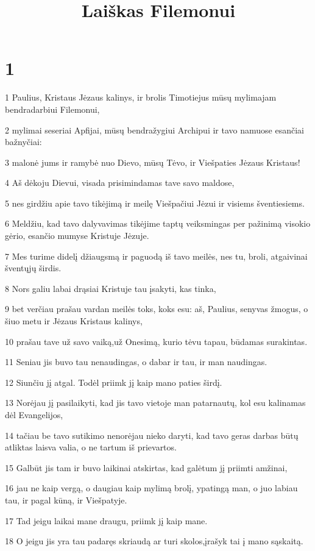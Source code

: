 

\title{Laiškas Filemonui}

\chapter{1}


\par 1 Paulius, Kristaus Jėzaus kalinys, ir brolis Timotiejus mūsų mylimajam bendradarbiui Filemonui, 
\par 2 mylimai seseriai Apfijai, mūsų bendražygiui Archipui ir tavo namuose esančiai bažnyčiai: 
\par 3 malonė jums ir ramybė nuo Dievo, mūsų Tėvo, ir Viešpaties Jėzaus Kristaus! 
\par 4 Aš dėkoju Dievui, visada prisimindamas tave savo maldose, 
\par 5 nes girdžiu apie tavo tikėjimą ir meilę Viešpačiui Jėzui ir visiems šventiesiems. 
\par 6 Meldžiu, kad tavo dalyvavimas tikėjime taptų veiksmingas per pažinimą visokio gėrio, esančio mumyse Kristuje Jėzuje. 
\par 7 Mes turime didelį džiaugsmą ir paguodą iš tavo meilės, nes tu, broli, atgaivinai šventųjų širdis. 
\par 8 Nors galiu labai drąsiai Kristuje tau įsakyti, kas tinka, 
\par 9 bet verčiau prašau vardan meilės toks, koks esu: aš, Paulius, senyvas žmogus, o šiuo metu ir Jėzaus Kristaus kalinys, 
\par 10 prašau tave už savo vaiką,­už Onesimą, kurio tėvu tapau, būdamas surakintas. 
\par 11 Seniau jis buvo tau nenaudingas, o dabar ir tau, ir man naudingas. 
\par 12 Siunčiu jį atgal. Todėl priimk jį kaip mano paties širdį. 
\par 13 Norėjau jį pasilaikyti, kad jis tavo vietoje man patarnautų, kol esu kalinamas dėl Evangelijos, 
\par 14 tačiau be tavo sutikimo nenorėjau nieko daryti, kad tavo geras darbas būtų atliktas laisva valia, o ne tartum iš prievartos. 
\par 15 Galbūt jis tam ir buvo laikinai atskirtas, kad galėtum jį priimti amžinai, 
\par 16 jau ne kaip vergą, o daugiau­ kaip mylimą brolį, ypatingą man, o juo labiau tau, ir pagal kūną, ir Viešpatyje. 
\par 17 Tad jeigu laikai mane draugu, priimk jį kaip mane. 
\par 18 O jeigu jis yra tau padaręs skriaudą ar turi skolos,­įrašyk tai į mano sąskaitą. 

